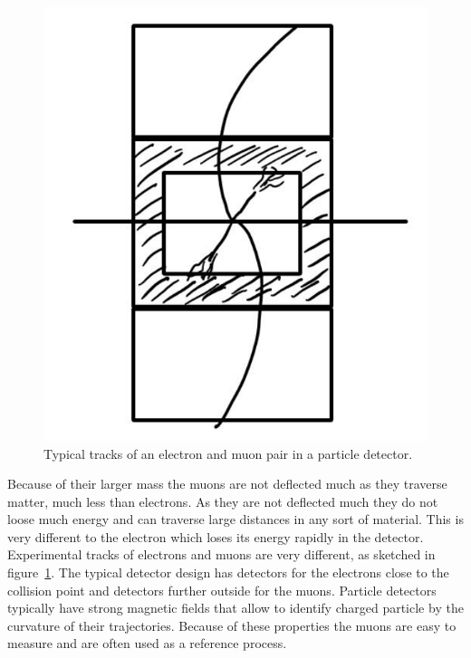 \documentclass[12pt]{article}
\begin{document}
\begin{figure}
\begin{center}
\includegraphics[scale=0.3]{images/electronmuonDetector.png}
\end{center}
\caption{Typical tracks of an electron and muon pair in a particle detector. }\label{fig:electronmuon}
\end{figure}  	 
Because of their larger mass the muons are not deflected much as they traverse matter, much less than electrons. As they are not deflected much they do not loose much energy and can traverse large distances in any sort of material. This is very different to the electron which loses its energy rapidly in the detector. Experimental tracks of electrons and muons are very different, as sketched in figure~\ref{fig:electronmuon}. The typical detector design has detectors for the electrons close to the collision point and detectors further outside for the muons. Particle detectors typically have strong magnetic fields that allow to identify charged particle by the curvature of their trajectories. Because of these properties the muons are easy to measure and are often used as a reference process. 
\end{document}
